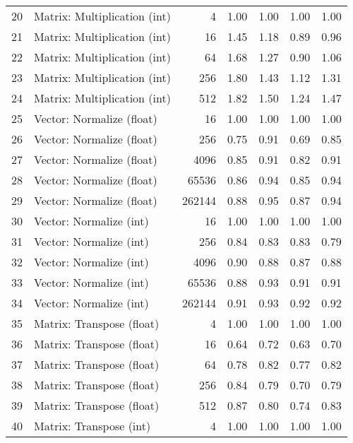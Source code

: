 \begin{tabular}{rlrrrrr}
 20 & Matrix: Multiplication (int)   &      4 &   1.00 &     1.00 &   1.00 &     1.00 \\
 21 & Matrix: Multiplication (int)   &     16 &   1.45 &     1.18 &   0.89 &     0.96 \\
 22 & Matrix: Multiplication (int)   &     64 &   1.68 &     1.27 &   0.90 &     1.06 \\
 23 & Matrix: Multiplication (int)   &    256 &   1.80 &     1.43 &   1.12 &     1.31 \\
 24 & Matrix: Multiplication (int)   &    512 &   1.82 &     1.50 &   1.24 &     1.47 \\
 25 & Vector: Normalize (float)  &     16 &   1.00 &     1.00 &   1.00 &     1.00 \\
 26 & Vector: Normalize (float)  &    256 &   0.75 &     0.91 &   0.69 &     0.85 \\
 27 & Vector: Normalize (float)  &   4096 &   0.85 &     0.91 &   0.82 &     0.91 \\
 28 & Vector: Normalize (float)  &  65536 &   0.86 &     0.94 &   0.85 &     0.94 \\
 29 & Vector: Normalize (float)  & 262144 &   0.88 &     0.95 &   0.87 &     0.94 \\
 30 & Vector: Normalize (int)    &     16 &   1.00 &     1.00 &   1.00 &     1.00 \\
 31 & Vector: Normalize (int)    &    256 &   0.84 &     0.83 &   0.83 &     0.79 \\
 32 & Vector: Normalize (int)    &   4096 &   0.90 &     0.88 &   0.87 &     0.88 \\
 33 & Vector: Normalize (int)    &  65536 &   0.88 &     0.93 &   0.91 &     0.91 \\
 34 & Vector: Normalize (int)    & 262144 &   0.91 &     0.93 &   0.92 &     0.92 \\
 35 & Matrix: Transpose (float)  &      4 &   1.00 &     1.00 &   1.00 &     1.00 \\
 36 & Matrix: Transpose (float)  &     16 &   0.64 &     0.72 &   0.63 &     0.70 \\
 37 & Matrix: Transpose (float)  &     64 &   0.78 &     0.82 &   0.77 &     0.82 \\
 38 & Matrix: Transpose (float)  &    256 &   0.84 &     0.79 &   0.70 &     0.79 \\
 39 & Matrix: Transpose (float)  &    512 &   0.87 &     0.80 &   0.74 &     0.83 \\
 40 & Matrix: Transpose (int)    &      4 &   1.00 &     1.00 &   1.00 &     1.00 \\

\end{tabular}
